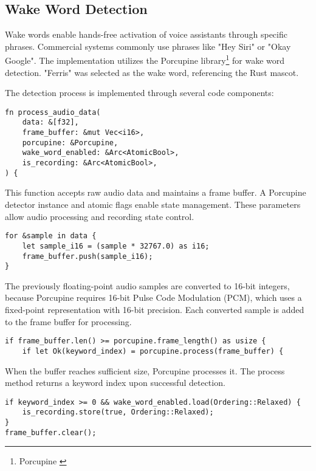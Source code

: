 \subsection{Wake Word Detection}
Wake words enable hands-free activation of voice assistants through specific phrases.
Commercial systems commonly use phrases like "Hey Siri" or "Okay Google".
The implementation utilizes the Porcupine library\footnote{Porcupine \cite{porcupine}} for wake word detection.
"Ferris" was selected as the wake word, referencing the Rust mascot.

The detection process is implemented through several code components:

\begin{verbatim}
fn process_audio_data(
    data: &[f32],
    frame_buffer: &mut Vec<i16>,
    porcupine: &Porcupine,
    wake_word_enabled: &Arc<AtomicBool>,
    is_recording: &Arc<AtomicBool>,
) {
\end{verbatim}

This function accepts raw audio data and maintains a frame buffer.
A Porcupine detector instance and atomic flags enable state management.
These parameters allow audio processing and recording state control.

\begin{verbatim}
for &sample in data {
    let sample_i16 = (sample * 32767.0) as i16;
    frame_buffer.push(sample_i16);
}
\end{verbatim}

The previously floating-point audio samples are converted to 16-bit integers,
because Porcupine requires 16-bit Pulse Code Modulation (PCM),
which uses a fixed-point representation with 16-bit precision.
Each converted sample is added to the frame buffer for processing.

\begin{verbatim}
if frame_buffer.len() >= porcupine.frame_length() as usize {
    if let Ok(keyword_index) = porcupine.process(frame_buffer) {
\end{verbatim}

When the buffer reaches sufficient size, Porcupine processes it.
The process method returns a keyword index upon successful detection.

\begin{verbatim}
if keyword_index >= 0 && wake_word_enabled.load(Ordering::Relaxed) {
    is_recording.store(true, Ordering::Relaxed);
}
frame_buffer.clear();
\end{verbatim}

